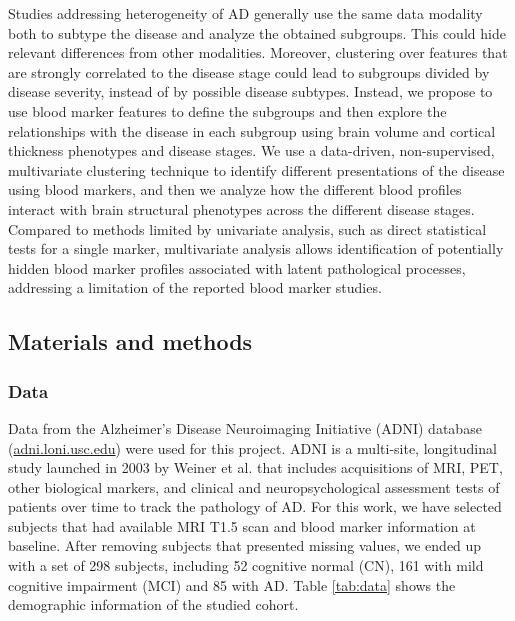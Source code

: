 Studies addressing heterogeneity of AD generally use the same data modality both to subtype the disease and analyze the obtained subgroups. This could hide relevant differences from other modalities. Moreover, clustering over features that are strongly correlated to the disease stage could lead to subgroups divided by disease severity, instead of by possible disease subtypes. Instead, we propose to use blood marker features to define the subgroups and then explore the relationships with the disease in each subgroup using brain volume and cortical thickness phenotypes and disease stages. We use a data-driven, non-supervised, multivariate clustering technique \cite{Ramazzotti2018} to identify different presentations of the disease using blood markers, and then we analyze how the different blood profiles interact with brain structural phenotypes across the different disease stages. Compared to methods limited by univariate analysis, such as direct statistical tests for a single marker, multivariate analysis allows identification of potentially hidden blood marker profiles associated with latent pathological processes, addressing a limitation of the reported blood marker studies. \\

\subsection{Materials and methods}
\subsubsection*{Data}
\label{data}

Data from the Alzheimer's Disease Neuroimaging Initiative (ADNI) database (\url{adni.loni.usc.edu}) were used for this project. ADNI is a multi-site, longitudinal study launched in 2003 by Weiner et al. \cite{Mueller2005a} that includes acquisitions of MRI, PET, other biological markers, and clinical and neuropsychological assessment tests of patients over time to track the pathology of AD. For this work, we have selected subjects that had available  MRI T1.5 scan and blood marker information at baseline. After removing subjects that presented missing values, we ended up with a set of 298 subjects, including 52 cognitive normal (CN), 161 with mild cognitive impairment (MCI) and 85 with AD. Table \ref{tab:data} shows the demographic information of the studied cohort. \\

